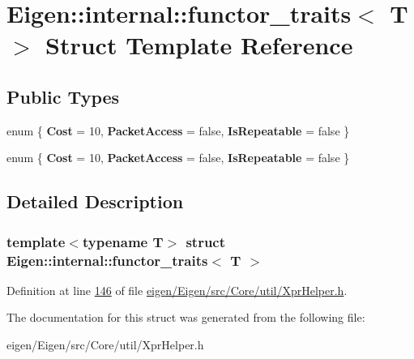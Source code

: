 \hypertarget{struct_eigen_1_1internal_1_1functor__traits}{}\section{Eigen\+:\+:internal\+:\+:functor\+\_\+traits$<$ T $>$ Struct Template Reference}
\label{struct_eigen_1_1internal_1_1functor__traits}
\subsection*{Public Types}
\begin{DoxyCompactItemize}
\item 
\mbox{\label{struct_eigen_1_1internal_1_1functor__traits_a7ec7e0053a2ed235cf0531c266a2cbd3}} 
enum \{ {\bfseries Cost} = 10, 
{\bfseries Packet\+Access} = false, 
{\bfseries Is\+Repeatable} = false
 \}
\item 
\mbox{\label{struct_eigen_1_1internal_1_1functor__traits_a992e50db8c897334c193f00cc9713b03}} 
enum \{ {\bfseries Cost} = 10, 
{\bfseries Packet\+Access} = false, 
{\bfseries Is\+Repeatable} = false
 \}
\end{DoxyCompactItemize}


\subsection{Detailed Description}
\subsubsection*{template$<$typename T$>$\newline
struct Eigen\+::internal\+::functor\+\_\+traits$<$ T $>$}



Definition at line \hyperlink{eigen_2_eigen_2src_2_core_2util_2_xpr_helper_8h_source_l00146}{146} of file \hyperlink{eigen_2_eigen_2src_2_core_2util_2_xpr_helper_8h_source}{eigen/\+Eigen/src/\+Core/util/\+Xpr\+Helper.\+h}.



The documentation for this struct was generated from the following file\+:\begin{DoxyCompactItemize}
\item 
eigen/\+Eigen/src/\+Core/util/\+Xpr\+Helper.\+h\end{DoxyCompactItemize}
